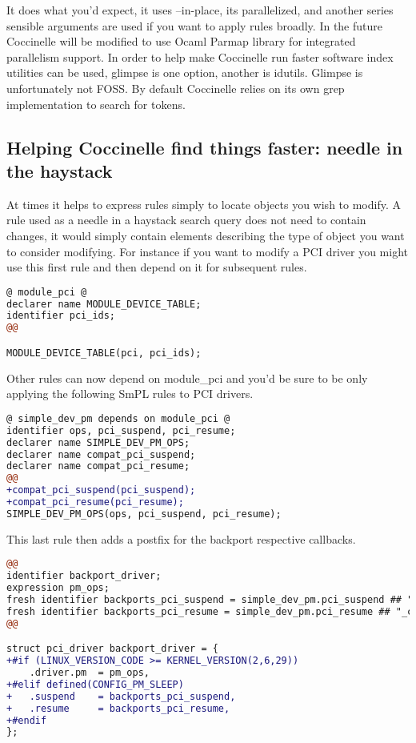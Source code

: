 \documentclass[a4paper,10pt]{article}
\begin{document}
It does what you'd expect, it uses --in-place, its parallelized, and another
series sensible arguments are used if you want to apply rules broadly. In
the future Coccinelle will be modified to use Ocaml Parmap library
for integrated parallelism support. In order to help make Coccinelle
run faster software index utilities can be used, glimpse is one option,
another is idutils. Glimpse is unfortunately not FOSS. By default
Coccinelle relies on its own grep implementation to search for tokens.

\subsection{Helping Coccinelle find things faster: needle in the haystack}

At times it helps to express rules simply to locate objects
you wish to modify. A rule used as a needle in a haystack
search query does not need to contain changes, it would
simply contain elements describing the type of object you
want to consider modifying. For instance if you want to
modify a PCI driver you might use this first rule and
then depend on it for subsequent rules.

\begin{lstlisting}[language=diff]
@ module_pci @
declarer name MODULE_DEVICE_TABLE;
identifier pci_ids;
@@

MODULE_DEVICE_TABLE(pci, pci_ids);
\end{lstlisting}

Other rules can now depend on module\_pci and you'd be
sure to be only applying the following SmPL rules to
PCI drivers.

\begin{lstlisting}[language=diff]
@ simple_dev_pm depends on module_pci @
identifier ops, pci_suspend, pci_resume;
declarer name SIMPLE_DEV_PM_OPS;
declarer name compat_pci_suspend;
declarer name compat_pci_resume;
@@
+compat_pci_suspend(pci_suspend);
+compat_pci_resume(pci_resume);
SIMPLE_DEV_PM_OPS(ops, pci_suspend, pci_resume);
\end{lstlisting}

This last rule then adds a postfix for the backport respective callbacks.

\begin{lstlisting}[language=diff]
@@
identifier backport_driver;
expression pm_ops;
fresh identifier backports_pci_suspend = simple_dev_pm.pci_suspend ## "_compat";
fresh identifier backports_pci_resume = simple_dev_pm.pci_resume ## "_compat";
@@

struct pci_driver backport_driver = {
+#if (LINUX_VERSION_CODE >= KERNEL_VERSION(2,6,29))
	.driver.pm  = pm_ops,
+#elif defined(CONFIG_PM_SLEEP)
+	.suspend	= backports_pci_suspend,
+	.resume 	= backports_pci_resume,
+#endif
};
\end{lstlisting}
\end{document}
